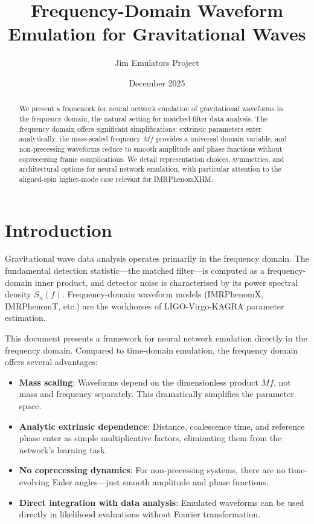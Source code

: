 \documentclass[11pt,a4paper]{article}
\title{Frequency-Domain Waveform Emulation for Gravitational Waves}
\author{Jim Emulators Project}
\date{December 2025}
\begin{document}
\maketitle

\begin{abstract}
We present a framework for neural network emulation of gravitational waveforms in the frequency domain, the natural setting for matched-filter data analysis. The frequency domain offers significant simplifications: extrinsic parameters enter analytically, the mass-scaled frequency $Mf$ provides a universal domain variable, and non-precessing waveforms reduce to smooth amplitude and phase functions without coprecessing frame complications. We detail representation choices, symmetries, and architectural options for neural network emulation, with particular attention to the aligned-spin higher-mode case relevant for IMRPhenomXHM.
\end{abstract}

\tableofcontents
\newpage

\section{Introduction}

Gravitational wave data analysis operates primarily in the frequency domain. The fundamental detection statistic---the matched filter---is computed as a frequency-domain inner product, and detector noise is characterised by its power spectral density $S_n(f)$. Frequency-domain waveform models (IMRPhenomX, IMRPhenomT, etc.) are the workhorses of LIGO-Virgo-KAGRA parameter estimation.

This document presents a framework for neural network emulation directly in the frequency domain. Compared to time-domain emulation, the frequency domain offers several advantages:

\begin{itemize}
    \item \textbf{Mass scaling}: Waveforms depend on the dimensionless product $Mf$, not mass and frequency separately. This dramatically simplifies the parameter space.
    \item \textbf{Analytic extrinsic dependence}: Distance, coalescence time, and reference phase enter as simple multiplicative factors, eliminating them from the network's learning task.
    \item \textbf{No coprecessing dynamics}: For non-precessing systems, there are no time-evolving Euler angles---just smooth amplitude and phase functions.
    \item \textbf{Direct integration with data analysis}: Emulated waveforms can be used directly in likelihood evaluations without Fourier transformation.
\end{itemize}
\end{document}
